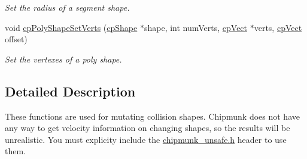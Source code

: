 \begin{DoxyCompactItemize}
\begin{DoxyCompactList}\small\item\em Set the radius of a segment shape. \end{DoxyCompactList}\item 
\hypertarget{group__unsafe_gaaa8234392878c2f39fc8036735b4b3a3}{void \hyperlink{group__unsafe_gaaa8234392878c2f39fc8036735b4b3a3}{cp\-Poly\-Shape\-Set\-Verts} (\hyperlink{structcp_shape}{cp\-Shape} $\ast$shape, int num\-Verts, \hyperlink{structcp_vect}{cp\-Vect} $\ast$verts, \hyperlink{structcp_vect}{cp\-Vect} offset)}\label{group__unsafe_gaaa8234392878c2f39fc8036735b4b3a3}

\begin{DoxyCompactList}\small\item\em Set the vertexes of a poly shape. \end{DoxyCompactList}\end{DoxyCompactItemize}


\subsection{Detailed Description}
These functions are used for mutating collision shapes. Chipmunk does not have any way to get velocity information on changing shapes, so the results will be unrealistic. You must explicity include the \hyperlink{chipmunk__unsafe_8h_source}{chipmunk\-\_\-unsafe.\-h} header to use them. 